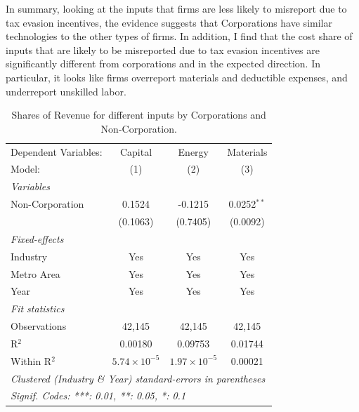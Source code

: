 \documentclass[
  12pt]{article}
\theoremstyle{definition}
\theoremstyle{remark}
\begin{document}
In summary, looking at the inputs that firms are less likely to
misreport due to tax evasion incentives, the evidence suggests that
Corporations have similar technologies to the other types of firms. In
addition, I find that the cost share of inputs that are likely to be
misreported due to tax evasion incentives are significantly different
from corporations and in the expected direction. In particular, it looks
like firms overreport materials and deductible expenses, and underreport
unskilled labor.

\begin{table}

\caption{\label{tbl-reg-shares}Shares of Revenue for different inputs by
Corporations and Non-Corporation.}

\begin{minipage}{\linewidth}

\begingroup
\centering
\begin{tabular}{lccc}
   \tabularnewline \midrule \midrule
   Dependent Variables: & Capital               & Energy                & Materials\\  
   Model:               & (1)                   & (2)                   & (3)\\  
   \midrule
   \emph{Variables}\\
   Non-Corporation      & 0.1524                & -0.1215               & 0.0252$^{**}$\\   
                        & (0.1063)              & (0.7405)              & (0.0092)\\   
   \midrule
   \emph{Fixed-effects}\\
   Industry             & Yes                   & Yes                   & Yes\\  
   Metro Area           & Yes                   & Yes                   & Yes\\  
   Year                 & Yes                   & Yes                   & Yes\\  
   \midrule
   \emph{Fit statistics}\\
   Observations         & 42,145                & 42,145                & 42,145\\  
   R$^2$                & 0.00180               & 0.09753               & 0.01744\\  
   Within R$^2$         & $5.74\times 10^{-5}$  & $1.97\times 10^{-5}$  & 0.00021\\  
   \midrule \midrule
   \multicolumn{4}{l}{\emph{Clustered (Industry \& Year) standard-errors in parentheses}}\\
   \multicolumn{4}{l}{\emph{Signif. Codes: ***: 0.01, **: 0.05, *: 0.1}}\\
\end{tabular}
\par\endgroup

\end{minipage}%

\end{table}%
\end{document}
